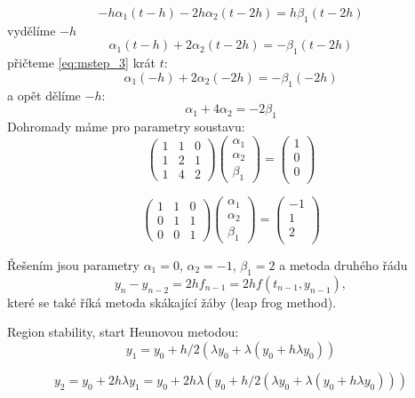 \documentclass[a4paper, 12pt]{book}
\theoremstyle{definition}
\begin{document}
\[
 -h\alpha_1 (t-h) -2h \alpha_2(t-2h) = h\beta_1 (t-2h)
\]
vydělíme $-h$
\[
   \alpha_1 (t-h) + 2 \alpha_2(t-2h) = -\beta_1 (t-2h)
\]
přičteme \eqref{eq:mstep_3} krát $t$:
\[
   \alpha_1 (-h) + 2 \alpha_2(-2h) = -\beta_1 (-2h)
\]
a opět dělíme $-h$:
\begin{equation}
\label{eq:mstep_4}
   \alpha_1  + 4 \alpha_2 = -2\beta_1 
\end{equation}
Dohromady máme pro parametry soustavu:
\[
  \begin{pmatrix}
    1 & 1 & 0 \\
    1 & 2 & 1 \\
    1 & 4 & 2
  \end{pmatrix}
  \begin{pmatrix}
    \alpha_1\\
    \alpha_2\\
    \beta_1
  \end{pmatrix}
  =
  \begin{pmatrix}
    1\\
    0\\
    0\\
  \end{pmatrix}
\]

\[
  \begin{pmatrix}
    1 & 1 & 0 \\
    0 & 1 & 1 \\
    0 & 0 & 1
  \end{pmatrix}
  \begin{pmatrix}
    \alpha_1\\
    \alpha_2\\
    \beta_1
  \end{pmatrix}
  =
  \begin{pmatrix}
    -1\\
    1\\
    2\\
  \end{pmatrix}
\]


Řešením jsou parametry $\alpha_1 = 0$, $\alpha_2=-1$, $\beta_1 = 2$ a metoda druhého řádu
\[
    y_n - y_{n-2} = 2 h  f_{n-1} = 2 h f(t_{n-1}, y_{n-1}),
\]
které se také říká metoda skákající žáby (leap frog method).

Region stability, start Heunovou metodou:
\[
   y_1 = y_0 + h/2(\lambda y_0 + \lambda (y_0 + h\lambda y_0))
\]

\[
    y_2  = y_0 + 2 h \lambda y_1 = y_0 + 2 h \lambda ( y_0 + h/2(\lambda y_0 + \lambda (y_0 + h\lambda y_0)))
\]
\end{document}
